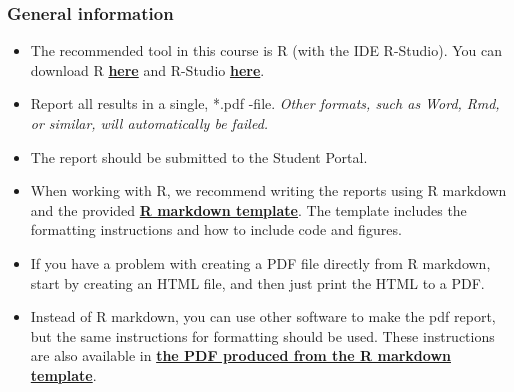 
\subsubsection*{General information}


\begin{itemize}
\itemsep0em
\item The recommended tool in this course is R (with the IDE R-Studio). You can download R \href{https://cran.r-project.org/}{\textbf{here}} and R-Studio \href{https://www.rstudio.com/products/rstudio/download/}{\textbf{here}}.

\item  Report all results in a single, *.pdf -file. \emph{Other formats, such as Word, Rmd, or similar, will automatically be failed.}

\item The report should be submitted to the Student Portal.

\item When working with R, we recommend writing the reports using R markdown and the provided \href{https://raw.githubusercontent.com/MansMeg/IntroML/master/templates/assignment_template.rmd}{\textbf{R markdown template}}. The template includes the formatting instructions and how to include code and figures.

\item If you have a problem with creating a PDF file directly from R markdown, start by creating an HTML file, and then just print the HTML to a PDF.

\item Instead of R markdown, you can use other software to make the pdf report, but the same instructions for formatting should be used. These instructions are also available in \href{https://raw.githubusercontent.com/MansMeg/IntroML/master/templates/assignment_template.pdf}{\textbf{the PDF produced from the R markdown template}}.



\end{itemize}
